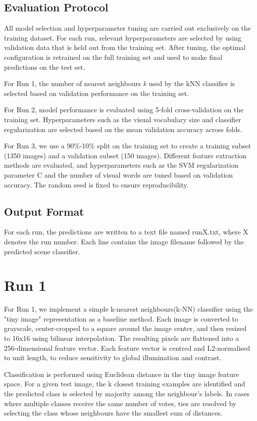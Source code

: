\documentclass[10pt,twocolumn,letterpaper]{article}
\begin{document}
\subsection{Evaluation Protocol}
All model selection and hyperparameter tuning are carried out exclusively on the training dataset. For each run, relevant hyperparameters are selected by using validation data that is held out from the training set. After tuning, the optimal configuration is retrained on the full training set and used to make final predictions on the test set.

For Run 1, the number of nearest neighbours \textit{k} used by the kNN classifier is selected based on validation performance on the training set.

For Run 2, model performance is evaluated using 5-fold cross-validation on the training set. Hyperparameters such as the visual vocabulary size and classifier regularization are selected based on the mean validation accuracy across folds.

For Run 3, we use a 90\%-10\% split on the training set to create a training subset (1350 images) and a validation subset (150 images). Different feature extraction methods are evaluated, and hyperparameters such as the SVM regularization parameter C and the number of visual words are tuned based on validation accuracy. The random seed is fixed to ensure reproducibility.

\subsection{Output Format}
For each run, the predictions are written to a text file named runX.txt, where X denotes the run number. Each line contains the image filename followed by the predicted scene classifier.

\section{Run 1}
For Run 1, we implement a simple k-nearest neighbours(k-NN) classifier using the "tiny image" representation as a baseline method. Each image is converted to grayscale, center-cropped to a square around the image center, and then resized to 16x16 using bilinear interpolation. The resulting pixels are flattened into a 256-dimensional feature vector. Each feature vector is centred and L2-normalised to unit length, to reduce sensitivity to global illumination and contrast.

Classification is performed using Euclidean distance in the tiny image feature space. For a given test image, the k closest training examples are identified and the predicted class is selected by majority among the neighbour's labels. In cases where multiple classes receive the same number of votes, ties are resolved by selecting the class whose neighbours have the smallest sum of distances.
\end{document}
